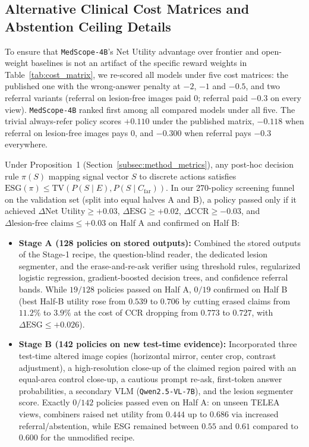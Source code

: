 \documentclass[5p,times,twocolumn,authoryear]{elsarticle}
\begin{document}
\subsection{Alternative Clinical Cost Matrices and Abstention Ceiling Details}
To ensure that \texttt{MedScope-4B}'s Net Utility advantage over frontier and open-weight baselines is not an artifact of the specific reward weights in Table~\ref{tab:cost_matrix}, we re-scored all models under five cost matrices: the published one with the wrong-answer penalty at $-2$, $-1$ and $-0.5$, and two referral variants (referral on lesion-free images paid $0$; referral paid $-0.3$ on every view). \texttt{MedScope-4B} ranked first among all compared models under all five. The trivial always-refer policy scores $+0.110$ under the published matrix, $-0.118$ when referral on lesion-free images pays $0$, and $-0.300$ when referral pays $-0.3$ everywhere.

Under Proposition~1 (Section~\ref{subsec:method_metrics}), any post-hoc decision rule $\pi(S)$ mapping signal vector $S$ to discrete actions satisfies $\text{ESG}(\pi) \le \text{TV}(P(S \mid E), P(S \mid C_{\text{far}}))$. In our 270-policy screening funnel on the validation set (split into equal halves A and B), a policy passed only if it achieved $\Delta\text{Net Utility} \ge +0.03$, $\Delta\text{ESG} \ge +0.02$, $\Delta\text{CCR} \ge -0.03$, and $\Delta\text{lesion-free claims} \le +0.03$ on Half A and confirmed on Half B:
\begin{itemize}[leftmargin=*,nosep]
    \item \textbf{Stage A (128 policies on stored outputs):} Combined the stored outputs of the Stage-1 recipe, the question-blind reader, the dedicated lesion segmenter, and the erase-and-re-ask verifier using threshold rules, regularized logistic regression, gradient-boosted decision trees, and confidence referral bands. While $19/128$ policies passed on Half A, $0/19$ confirmed on Half B (best Half-B utility rose from $0.539$ to $0.706$ by cutting erased claims from $11.2\%$ to $3.9\%$ at the cost of CCR dropping from $0.773$ to $0.727$, with $\Delta\text{ESG} \le +0.026$).
    \item \textbf{Stage B (142 policies on new test-time evidence):} Incorporated three test-time altered image copies (horizontal mirror, center crop, contrast adjustment), a high-resolution close-up of the claimed region paired with an equal-area control close-up, a cautious prompt re-ask, first-token answer probabilities, a secondary VLM (\texttt{Qwen2.5-VL-7B}), and the lesion segmenter score. Exactly $0/142$ policies passed even on Half A: on unseen TELEA views, combiners raised net utility from $0.444$ up to $0.686$ via increased referral/abstention, while ESG remained between $0.55$ and $0.61$ compared to $0.600$ for the unmodified recipe.
\end{itemize}
\end{document}
